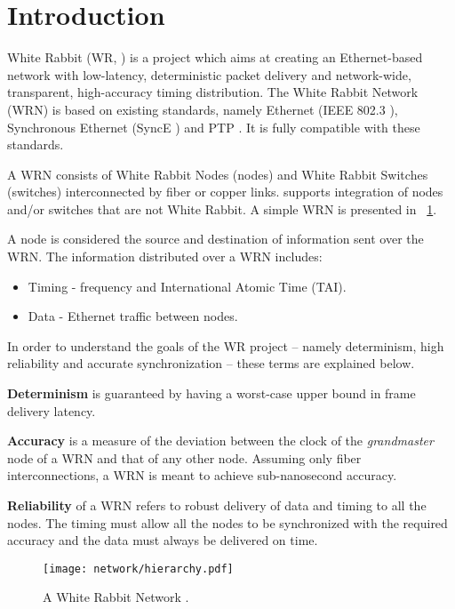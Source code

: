\section{Introduction}

White Rabbit (WR, \cite{biblio:whiteRabbit}) is a project which aims at creating an
Ethernet-based network with low-latency, deterministic packet delivery
and network-wide, transparent, high-accuracy timing distribution. The
White Rabbit Network (WRN) is based on existing standards, namely
Ethernet (IEEE 802.3 \cite{biblio:IEEE8023}), Synchronous Ethernet
(SyncE \cite{biblio:SynchE}) and PTP \cite{biblio:IEEE1588}. 
It is fully compatible with these standards.

A WRN consists of White Rabbit Nodes (nodes) and White Rabbit Switches
(switches) interconnected by fiber or copper links. 
supports integration of nodes and/or switches that are not White Rabbit. 
A simple WRN is presented in \figurename~\ref{fig:WRnetwork}.

A node is considered the source and destination of information sent
over the WRN. The information distributed over a WRN includes:
\begin{itemize}
   \item  Timing - frequency and International Atomic Time (TAI).
   \item  Data  - Ethernet traffic between nodes.
\end{itemize} 

In order to understand the goals of the WR project -- namely
determinism, high reliability and accurate synchronization -- these
terms are explained below.

\textbf{Determinism} is guaranteed by having a worst-case upper bound
in frame delivery latency.  

\textbf{Accuracy} is a measure of the deviation between the clock of
the \textit{grandmaster} node of a WRN and that of any other node.
Assuming only fiber interconnections, a WRN is meant to achieve
sub-nanosecond accuracy. 

\textbf{Reliability} of a WRN refers to robust delivery of data and
timing to all the nodes.
The timing must allow all the nodes to be
synchronized with the required accuracy and the data must always be
delivered on time.
\begin{figure}[!t]
\centering
\texttt{[image: network/hierarchy.pdf]}
\caption{A White Rabbit Network \cite{biblio:TomekMSc}.}
\label{fig:WRnetwork}
\end{figure}


